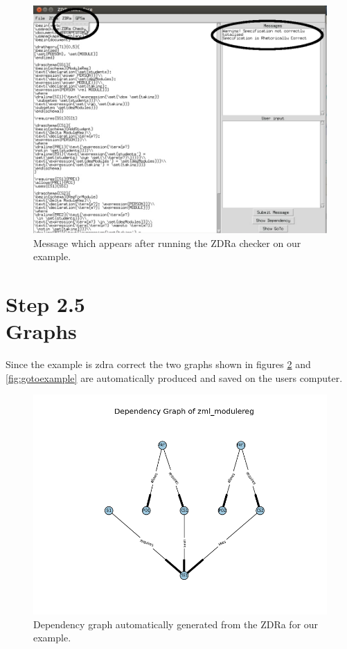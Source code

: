 \begin{figure}[H]
\centering
\includegraphics[scale=0.3]{Figures/fullexample/zdracorrect.png}
\caption{Message which appears after running the ZDRa checker on our example. \label{fig:zdracorrect}}
\end{figure}

\section{Step 2.5\\Graphs}

Since the example is \gls{zdra} correct the two graphs shown in figures \ref{fig:depexample} and \ref{fig:gotoexample} are automatically produced and saved on the users computer.

\begin{figure}[H]
\centering
\includegraphics[scale=0.55]{Figures/fullexample/dp_fullexample.png}
\caption{Dependency graph automatically generated from the ZDRa for our example. \label{fig:depexample}}
\end{figure}

